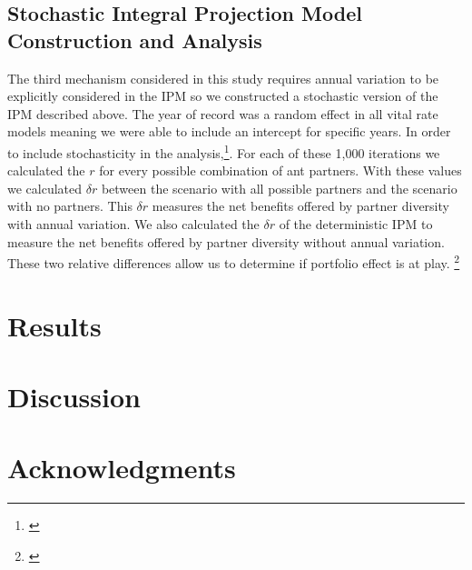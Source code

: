 \documentclass[11pt]{article}
\newcommand{\tom}[2]{{\color{red}{#1}}\footnote{\textit{\color{red}{#2}}}}
\begin{document}
\subsection*{Stochastic Integral Projection Model Construction and Analysis}
  
The third mechanism considered in this study requires annual variation to be explicitly considered in the IPM so we constructed a stochastic version of the IPM described above. 
The year of record was a random effect in all vital rate models meaning we were able to include an intercept for specific years. 
In order to include stochasticity in the analysis,\tom{ we randomly sampled from the year-random effect intercepts 1,000 times}{I don't think you have communicated, in either words or notation, that the random intercepts are unique to ant state.}.
For each of these 1,000 iterations we calculated the $r$ for every possible combination of ant partners. 
With these values we calculated $\delta r$ between the scenario with all possible partners and the scenario with no partners.
This $\delta r$ measures the net benefits offered by partner diversity with annual variation.
We also calculated the $\delta r$ of the deterministic IPM to measure the net benefits offered by partner diversity without annual variation. 
These two relative differences allow us to determine if portfolio effect is at play.
\tom{Portfolio effect is demonstrated when the net benefit with annual variation is larger than the net benefit without annual variation.}{This is good and would make a good figure (posteriors of delta r with and without annual variation.)} 
			
    
  
\section*{Results}

\section*{Discussion}


\section*{Acknowledgments}

\end{document}
